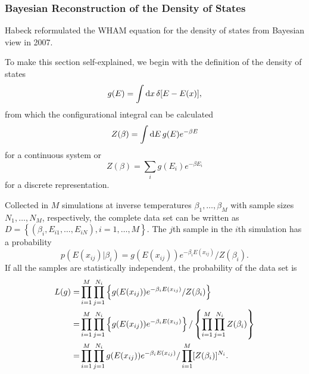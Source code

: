 \subsubsection{Bayesian Reconstruction of the Density of States\label{Sec:FEM:WHAM_Bayes}}
Habeck reformulated the WHAM equation for the density of states from Bayesian view in 2007.\cite{HabeckPRL2007}

To make this section self-explained, we begin with the definition of the density of states
\begin{equation}
    g(E)=\int\mathop{}\!\mathrm{d} x\,\delta[E-E(x)],
\end{equation}
from which the configurational integral can be calculated
\begin{equation}
    Z(\beta)=\int\mathop{}\!\mathrm{d} E\,g(E)e^{-\beta E}
\end{equation}
for a continuous system or
\begin{equation}
    Z(\beta)=\sum_i g(E_i)e^{-\beta E_i}
\end{equation}
for a discrete representation. 

Collected in $M$ simulations at inverse temperatures $\beta_1,\dots,\beta_M$ with sample sizes $N_1,\dots,N_M$, respectively, the complete data set can be written as $D=\left\{\left(\beta_i,E_{i1},\dots,E_{iN}\right),i=1,\dots,M\right\}$. The $j$th sample in the $i$th simulation has a probability
\begin{equation}
    p(E(x_{ij})|\beta_i)=g(E(x_{ij}))e^{-\beta_{i}E(x_{ij})}/Z(\beta_i).
\end{equation}
If all the samples are statistically independent, the probability of the data set is
\begin{align}
    L(g)=&\prod_{i=1}^{M}\prod_{j=1}^{N_i}\left\{g(E(x_{ij}))e^{-\beta_{i}E(x_{ij})}/Z(\beta_i)\right\}\notag\\
        =&\prod_{i=1}^{M}\prod_{j=1}^{N_i}\left\{g(E(x_{ij}))e^{-\beta_{i}E(x_{ij})}\right\}/\left\{\prod_{i=1}^{M}\prod_{j=1}^{N_i}Z(\beta_i)\right\}\notag\\
        =&\prod_{i=1}^{M}\prod_{j=1}^{N_i}g(E(x_{ij}))e^{-\beta_{i}E(x_{ij})}/\prod_{i=1}^{M}[Z(\beta_i)]^{N_i}.
\end{align}


